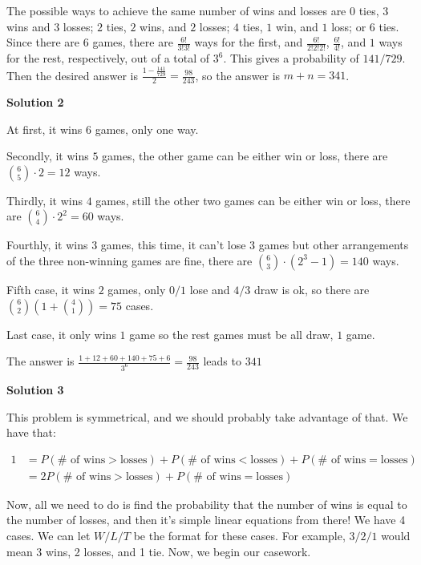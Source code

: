 \begin{enumerate}
 The possible ways to achieve the same number of wins and losses are $0$ ties, $3$ wins and $3$ losses; $2$ ties, $2$ wins, and $2$ losses; $4$ ties, $1$ win, and $1$ loss; or $6$ ties. Since there are $6$ games, there are $\frac{6!}{3!3!}$ ways for the first, and $\frac{6!}{2!2!2!}$, $\frac{6!}{4!}$, and $1$ ways for the rest, respectively, out of a total of $3^6$. This gives a probability of $141/729$. Then the desired answer is $\frac{1 - \frac{141}{729}}{2} = \frac{98}{243}$, so the answer is $m+n = \boxed{341}$.

 



\textbf{Solution 2}

At first, it wins $6$ games, only one way.

 Secondly, it wins $5$ games, the other game can be either win or loss, there are $\binom{6}{5}\cdot 2=12$ ways.

 Thirdly, it wins $4$ games, still the other two games can be either win or loss, there are $\binom{6}{4}\cdot 2^2=60$ ways.

 Fourthly, it wins $3$ games, this time, it can't lose $3$ games but other arrangements of the three non-winning games are fine, there are $\binom{6}{3}\cdot (2^3-1)=140$ ways.

 Fifth case, it wins $2$ games, only $0/1$ lose and  $4/3$ draw is ok, so there are $\binom{6}{2}(1+\binom{4}{1})=75$ cases.

 Last case, it only wins $1$ game so the rest games must be all draw, $1$ game.

 The answer is $\frac{1+12+60+140+75+6}{3^6}=\frac{98}{243}$ leads to $\boxed{341}$




\textbf{Solution 3}

This problem is symmetrical, and we should probably take advantage of that. We have that:

 
 \begin{align*} 1 &= P(\#\text{ of wins} > \text{losses}) + P(\#\text{ of wins} < \text{losses}) + P(\#\text{ of wins} = \text{losses}) \\   &= 2P(\#\text{ of wins} > \text{losses}) + P(\#\text{ of wins} = \text{losses}) \end{align*}


 Now, all we need to do is find the probability that the number of wins is equal to the number of losses, and then it's simple linear equations from there! We have 4 cases. We can let $W/L/T$ be the format for these cases. For example, $3/2/1$ would mean 3 wins, 2 losses, and 1 tie. Now, we begin our casework.


\end{enumerate}
